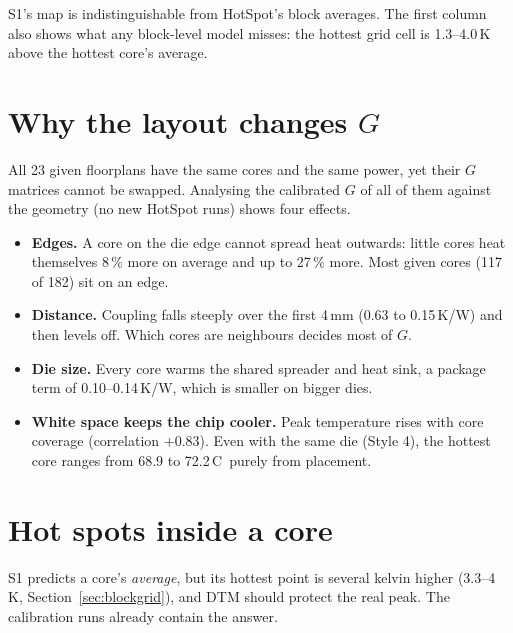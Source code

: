 \documentclass[11pt,a4paper]{article}
\newcommand{\degC}{\,\textdegree C}
\begin{document}
S1's map is indistinguishable from HotSpot's block averages. The first column also shows what any
block-level model misses: the hottest grid cell is 1.3--4.0\,K above the hottest core's average.

\section{Why the layout changes $G$}\label{sec:layout}
All 23 given floorplans have the same cores and the same power, yet their $G$ matrices cannot be
swapped. Analysing the calibrated $G$ of all of them against the geometry (no new HotSpot runs)
shows four effects.

\begin{itemize}
  \item \textbf{Edges.} A core on the die edge cannot spread heat outwards: little cores heat
        themselves 8\,\% more on average and up to 27\,\% more. Most given cores (117 of 182) sit on
        an edge.
  \item \textbf{Distance.} Coupling falls steeply over the first 4\,mm (0.63 to 0.15\,K/W) and then
        levels off. Which cores are neighbours decides most of $G$.
  \item \textbf{Die size.} Every core warms the shared spreader and heat sink, a package term of
        0.10--0.14\,K/W, which is smaller on bigger dies.
  \item \textbf{White space keeps the chip cooler.} Peak temperature rises with core coverage
        (correlation $+0.83$). Even with the same die (Style 4), the hottest core ranges from 68.9
        to 72.2\degC\ purely from placement.
\end{itemize}

\section{Hot spots inside a core}\label{sec:hotspot}
S1 predicts a core's \emph{average}, but its hottest point is several kelvin higher
(3.3--4\,K, Section~\ref{sec:blockgrid}), and DTM
should protect the real peak. The calibration runs already contain the answer.
\end{document}
